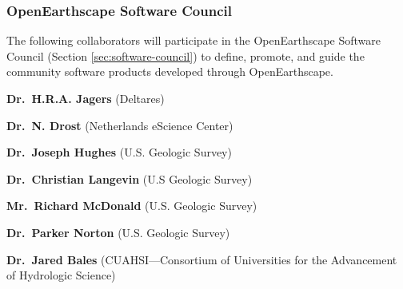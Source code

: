 \subsubsection*{OpenEarthscape Software Council}

The following collaborators will participate in the OpenEarthscape Software Council
(Section \ref{sec:software-council}) to define, promote, and guide the community
software products developed through OpenEarthscape.

\begin{compactitem}

\item \textbf{Dr.\ H.R.A. Jagers} (Deltares)

\item \textbf{Dr.\ N. Drost} (Netherlands eScience Center)

\item \textbf{Dr.\ Joseph Hughes} (U.S. Geologic Survey)

\item \textbf{Dr.\ Christian Langevin} (U.S Geologic Survey)

\item \textbf{Mr.\ Richard McDonald} (U.S. Geologic Survey)

\item \textbf{Dr.\ Parker Norton} (U.S. Geologic Survey)

\item \textbf{Dr.\ Jared Bales} (CUAHSI---Consortium of Universities for the Advancement of Hydrologic Science)

\end{compactitem}














